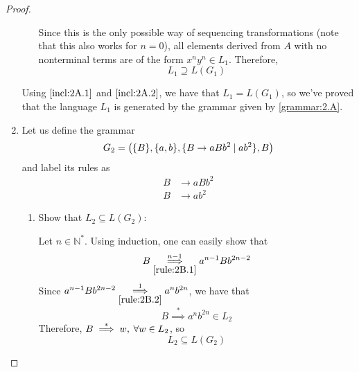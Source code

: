 \documentclass[11pt]{article}
\begin{document}
\begin{proof}
\begin{enumerate}
\begin{enumerate}
            Since this is the only possible way of sequencing transformations (note that
            this also works for $n=0$), all elements derived from $A$ with no
            nonterminal terms are of the form $x^ny^n \in L_1$. Therefore, 
            \begin{equation}\label{incl:2A.2}
                L_1 \supseteq L(G_1) 
            \end{equation}
        \end{enumerate}
        Using $\eqref{incl:2A.1}$ and $\eqref{incl:2A.2}$, we have that $L_1 = L(G_1)$, so
        we've proved that the language $L_1$ is generated by the grammar given by \eqref{grammar:2.A}.

        \vspace{1em}

        \item Let us define the grammar 
            \begin{equation}\label{grammar:2.B}
                G_2 = \big(\{B\}, \{a, b\}, \{B \to aBb^2 \hspace{0.25em}|\hspace{0.25em} ab^2\}, B\big)
            \end{equation}
        and label its rules as
        \begin{align}
            B &\to aBb^2 \label{rule:2B.1} \\
            B &\to ab^2 \label{rule:2B.2}
        \end{align}
        \begin{enumerate}
            \item Show that $L_2 \subseteq L(G_2)$:

            Let $n \in \mathbb{N}^*$. Using induction, one can easily show that 
            \[
                B \overset{n - 1}{\underset{\eqref{rule:2B.1}}{\implies}} a^{n - 1}Bb^{2n - 2}
            \] 
            Since $a^{n - 1}Bb^{2n - 2} \overset{1}{\underset{\eqref{rule:2B.2}}{\implies}} a^nb^{2n}$,
            we have that
            \begin{equation}
                B \overset{*}{\implies} a^nb^{2n} \in L_2
            \end{equation}
            Therefore, $B \overset{*}{\implies} w, \hspace{0.25em} \forall w \in L_2$, so
            \begin{equation}\label{incl:2B.1}
                L_2 \subseteq L(G_2)
            \end{equation}


\end{enumerate}
\end{enumerate}
\end{proof}
\end{document}
